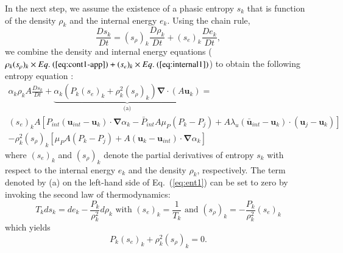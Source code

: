 \documentclass[preprint,10pt]{elsarticle}
\renewcommand{\div}{\mbold{\nabla}\! \cdot \!}
\newcommand{\grad}{\mbold{\nabla}}
\newcommand{\mbold}[1]{\boldsymbol#1}
\newcommand{\eqt}[1]{Eq.~(\ref{#1})}                     %
\begin{document}
\begin{appendices}
In the next step, we assume the existence of a phasic entropy $s_k$ that is function of the density $\rho_k$ and the  internal energy $e_k$. Using the chain rule, 
\begin{equation}
\frac{Ds_k}{Dt} = (s_\rho)_k \frac{D \rho_k}{Dt} + (s_e)_k \frac{De_k}{Dt},
\end{equation}
we combine the density and internal energy equations ($\rho_k (s_\rho)_k \times \eqt{eq:cont1-app}  + (s_e)_k \times \eqt{eq:internal1}$) to obtain  the following entropy equation :
\begin{multline}
\label{eq:ent1}
\alpha_k \rho_k A \frac{Ds_k}{Dt} + 
\underbrace{\alpha_k \left( P_k (s_e)_k + \rho_k^2 (s_\rho)_k \right)  \div \left( A \mbold u_k \right) }_\textrm{(a)} = \\
(s_e)_k A \left[ P_{int}(\mbold u_{int}-\mbold u_k)\cdot \grad \alpha_k - \bar{P}_{int} A \mu_P (P_k-P_j) + A \lambda_u (\bar{\mbold u}_{int}-\mbold u_k) \cdot (\mbold u_j-\mbold u_k)\right] \\
- \rho_k^2 (s_\rho)_k \left[ \mu_P A (P_k-P_j) + A(\mbold u_k-\mbold u_{int}) \cdot \grad \alpha_k\right] 
\end{multline}
where $(s_e)_k$ and $(s_\rho)_k$ denote the partial derivatives of entropy $s_k$ with respect to the internal energy $e_k$ and the density $\rho_k$, respectively.
The term denoted by (a) on the left-hand side of \eqt{eq:ent1} can be set to zero by invoking the second law of thermodynamics:
\begin{equation}
T_k ds_k = de_k - \frac{P_k}{\rho_k^2} d \rho_k \text{ with } (s_e)_k = \frac{1}{T_k} \text{ and } (s_\rho)_k = - \frac{P_k}{\rho_k^2} (s_e)_k
\end{equation}
which yields
\begin{equation}
\label{eq:ent2}
 P_k (s_e)_k + \rho_k^2 (s_\rho)_k = 0 .
\end{equation} 


\end{appendices}
\end{document}
